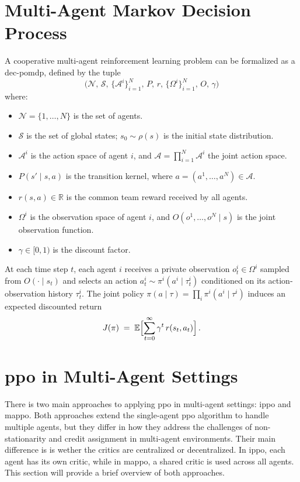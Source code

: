 \section{Multi-Agent Markov Decision Process}
A cooperative multi-agent reinforcement learning problem can be formalized as a \gls{dec-pomdp}\cite{oliehoek_concise_2016}, defined by the tuple
\[
  \bigl(\mathcal{N},\,\mathcal{S},\,\{\mathcal{A}^i\}_{i=1}^N,\,P,\,r,\,\{\Omega^i\}_{i=1}^N,\,O,\,\gamma\bigr)
\]
where:
\begin{itemize}
  \item $\mathcal{N} = \{1,\dots,N\}$ is the set of agents.
  \item $\mathcal{S}$ is the set of global states; $s_0\sim\rho(s)$ is the initial state distribution.
  \item $\mathcal{A}^i$ is the action space of agent $i$, and $\mathcal{A} = \prod_{i=1}^N\mathcal{A}^i$ the joint action space.
  \item $P(s' \mid s, a)$ is the transition kernel, where $a=(a^1,\dots,a^N)\in\mathcal{A}$.
  \item $r(s,a)\in\mathbb{R}$ is the common team reward received by all agents.
  \item $\Omega^i$ is the observation space of agent $i$, and $O(o^1,\dots,o^N\mid s)$ is the joint observation function.
  \item $\gamma\in[0,1)$ is the discount factor.
\end{itemize}
At each time step $t$, each agent $i$ receives a private observation $o^i_t\in\Omega^i$ sampled from $O(\cdot\mid s_t)$ and selects an action $a^i_t\sim\pi^i(a^i\mid\tau^i_t)$ conditioned on its action‐observation history $\tau^i_t$. The joint policy $\pi(a\mid \tau) = \prod_i \pi^i(a^i\mid \tau^i)$ induces an expected discounted return
\[
  J(\pi) \;=\; \mathbb{E}\Bigl[\sum_{t=0}^\infty \gamma^t\,r(s_t, a_t)\Bigr]\,. 
\]

\section{\gls{ppo} in Multi-Agent Settings}
There is two main approaches to applying \gls{ppo} in multi-agent settings: \gls{ippo} and \gls{mappo}. Both approaches extend the single-agent \gls{ppo} algorithm to handle multiple agents, but they differ in how they address the challenges of non-stationarity and credit assignment in multi-agent environments. Their main difference is is wether the critics are centralized or decentralized. In \gls{ippo}, each agent has its own critic, while in \gls{mappo}, a shared critic is used across all agents. This section will provide a brief overview of both approaches.

